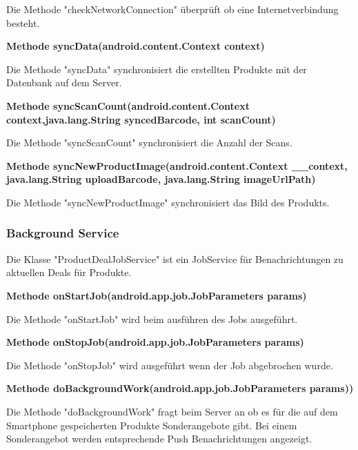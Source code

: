 \documentclass{scrartcl}
\begin{document}
\noindent Die Methode "checkNetworkConnection" überprüft ob eine Internetverbindung besteht. \newline 

\noindent\textbf{Methode syncData(android.content.Context context)}

\noindent Die Methode "syncData" synchronisiert die erstellten Produkte mit der Datenbank auf dem Server. \newline 

\noindent\textbf{Methode syncScanCount(android.content.Context context,\newline            java.lang.String syncedBarcode, int scanCount)}

\noindent Die Methode "syncScanCount" synchronisiert die Anzahl der Scans. \newline

\noindent\textbf{Methode syncNewProductImage(android.content.Context \_\_context, \newline   java.lang.String uploadBarcode, java.lang.String imageUrlPath)}

\noindent Die Methode "syncNewProductImage" synchronisiert das Bild des Produkts. \newline 

\subsubsection{Background Service}
Die Klasse "ProductDealJobService" ist ein JobService für Benachrichtungen zu aktuellen Deals für Produkte. \newline 

\noindent\textbf{Methode onStartJob(android.app.job.JobParameters params)}

\noindent Die Methode "onStartJob" wird beim ausführen des Jobs ausgeführt. \newline 

\noindent\textbf{Methode onStopJob(android.app.job.JobParameters params)}

\noindent Die Methode "onStopJob" wird ausgeführt wenn der Job abgebrochen wurde. \newline 

\noindent\textbf{Methode doBackgroundWork(android.app.job.JobParameters params))}

\noindent Die Methode "doBackgroundWork" fragt beim Server an ob es für die auf dem Smartphone gespeicherten Produkte Sonderangebote gibt. Bei einem Sonderangebot werden entsprechende Push Benachrichtungen angezeigt. \newline 
\end{document}
